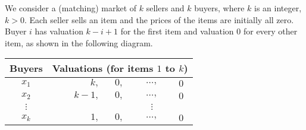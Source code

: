 
We consider a (matching) market of $k$ sellers and $k$ buyers, where $k$ is an integer, $k>0$. 
Each seller sells an item and the prices of the items are initially all zero. Buyer $i$ has valuation $k-i+1$ for the first item and valuation $0$ for every other item, as shown in the following diagram.

\vspace*{0.5cm}
\begin{tabular}{c r c c c}
    Buyers & \multicolumn{4}{c}{Valuations (for items $1$ to $k$)} \\
    \hline
    $x_1$ & $k,$ & $0,$ & $\ldots,$ & $0$ \\
    $x_2$ & $k-1,$ & $0,$ & $\ldots,$ & $0$ \\
    $\vdots$ & & & $\vdots$ \\
    $x_k$ & $1,$ & $0,$ & $\ldots,$ & $0$ \\
\end{tabular}

